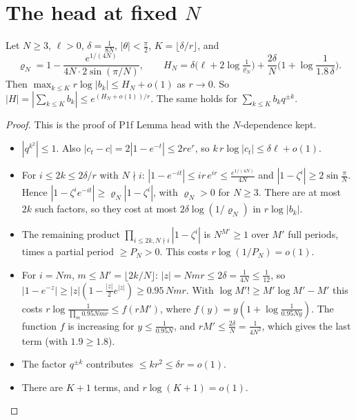 \documentclass[11pt]{article}
\theoremstyle{remark}\newtheorem{remark}[theorem]{Remark}
\begin{document}
\section{The head at fixed $N$}
\begin{lemma}\label{lem:headN}
Let $N\ge3$, $\ell>0$, $\delta=\frac1{8N}$, $|\theta|<\frac\pi2$, $K=\lfloor\delta/r\rfloor$, and
\[\varrho_N=1-\frac{e^{1/(4N)}}{4N\cdot2\sin(\pi/N)},\qquad
H_N=\delta\big(\ell+2\log\tfrac1{\varrho_N}\big)+\frac{2\delta}N\Big(1+\log\frac1{1.8\,\delta}\Big).\]
Then $\max_{k\le K}r\log|b_k|\le H_N+o(1)$ as $r\to0$. So $|H|=|\sum_{k\le K}b_k|\le e^{(H_N+o(1))/r}$. The same holds for $\sum_{k\le K}b_kq^{\pm k}$.
\end{lemma}
\begin{proof}
This is the proof of P1f Lemma head with the $N$-dependence kept.
\begin{itemize}
\item $|q^{k^2}|\le1$. Also $|c_t-c|=2|1-e^{-t}|\le2re^r$, so $k\,r\log|c_t|\le\delta\ell+o(1)$.
\item For $i\le2k\le2\delta/r$ with $N\nmid i$: $|1-e^{-it}|\le ir\,e^{ir}\le\frac{e^{1/(4N)}}{4N}$ and $|1-\zeta^i|\ge2\sin\frac\pi N$. Hence $|1-\zeta^ie^{-it}|\ge\varrho_N|1-\zeta^i|$, with $\varrho_N>0$ for $N\ge3$. There are at most $2k$ such factors, so they cost at most $2\delta\log(1/\varrho_N)$ in $r\log|b_k|$.
\item The remaining product $\prod_{i\le2k,N\nmid i}|1-\zeta^i|$ is $N^{M'}\ge1$ over $M'$ full periods, times a partial period $\ge P_N>0$. This costs $r\log(1/P_N)=o(1)$.
\item For $i=Nm$, $m\le M'=\lfloor2k/N\rfloor$: $|z|=Nmr\le2\delta=\frac1{4N}\le\frac1{12}$, so $|1-e^{-z}|\ge|z|(1-\frac{|z|}2e^{|z|})\ge0.95\,Nmr$.
With $\log M'!\ge M'\log M'-M'$ this costs $r\log\frac1{\prod_m0.95Nmr}\le f(rM')$, where $f(y)=y(1+\log\frac1{0.95Ny})$. The function $f$ is increasing for $y\le\frac1{0.95N}$, and $rM'\le\frac{2\delta}N=\frac1{4N^2}$, which gives the last term (with $1.9\ge1.8$).
\item The factor $q^{\pm k}$ contributes $\le kr^2\le\delta r=o(1)$.
\item There are $K+1$ terms, and $r\log(K+1)=o(1)$.
\end{itemize}
\end{proof}
\end{document}
